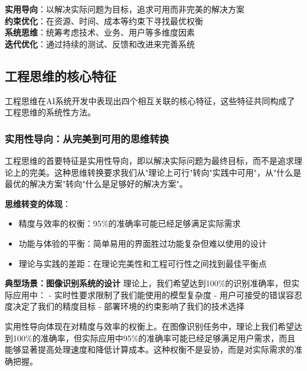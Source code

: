 \begin{tcolorbox}[colback=orange!5!white,colframe=orange!75!black,title=核心概念：工程思维的四大支柱]
\textbf{实用导向}：以解决实际问题为目标，追求可用而非完美的解决方案\\
\textbf{约束优化}：在资源、时间、成本等约束下寻找最优权衡\\
\textbf{系统思维}：统筹考虑技术、业务、用户等多维度因素\\
\textbf{迭代优化}：通过持续的测试、反馈和改进来完善系统
\end{tcolorbox}

\subsection{工程思维的核心特征}

工程思维在AI系统开发中表现出四个相互关联的核心特征，这些特征共同构成了工程思维的系统性方法。


\subsubsection{实用性导向：从完美到可用的思维转换}
工程思维的首要特征是实用性导向，即以解决实际问题为最终目标，而不是追求理论上的完美。这种思维转换要求我们从"理论上可行"转向"实践中可用"，从"什么是最优的解决方案"转向"什么是足够好的解决方案"。

\textbf{思维转变的体现}：
\begin{itemize}
\item 精度与效率的权衡：95\%的准确率可能已经足够满足实际需求
\item 功能与体验的平衡：简单易用的界面胜过功能复杂但难以使用的设计
\item 理论与实践的差距：在理论完美性和工程可行性之间找到最佳平衡点
\end{itemize}

\textbf{典型场景：图像识别系统的设计}
理论上，我们希望达到100\%的识别准确率，但实际应用中：
- 实时性要求限制了我们能使用的模型复杂度
- 用户可接受的错误容忍度决定了我们的精度目标
- 部署环境的约束影响了我们的技术选择

实用性导向体现在对精度与效率的权衡上。在图像识别任务中，理论上我们希望达到100\%的准确率，但实际应用中95\%的准确率可能已经足够满足用户需求，而且能够显著提高处理速度和降低计算成本。这种权衡不是妥协，而是对实际需求的准确把握。

